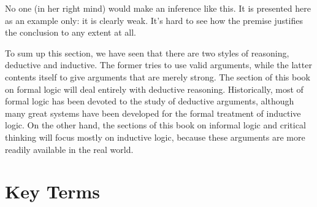 \begin{kormanize}
\end{kormanize}

No one (in her right mind) would make an inference like this. It is presented here as an example only: it is clearly weak. It's hard to see how the premise justifies the conclusion to any extent at all.

To sum up this section, we have seen that there are two styles of reasoning, deductive and inductive. The former tries to use valid arguments, while the latter contents itself to give arguments that are merely strong. The section of this book on formal logic will deal entirely with deductive reasoning. Historically, most of formal logic has been devoted to the study of deductive arguments, although many great systems have been developed for the formal treatment of inductive logic. On the other hand, the sections of this book on informal logic and critical thinking will focus mostly on inductive logic, because these arguments are more readily available in the real world.

\section*{Key Terms}
\begin{sortedlist}
\end{sortedlist}
